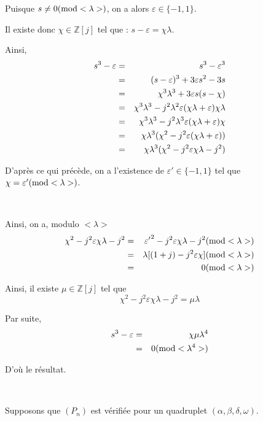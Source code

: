 Puisque $s \neq 0 (\operatorname{mod} < \lambda >)$, on a alors $\varepsilon \in \{ -
1, 1 \}$.

Il existe donc $\chi \in \mathbb{Z} [j]$ tel que : $s - \varepsilon = \chi
\lambda$.

Ainsi,
\begin{eqnarray*}
  s^3 - \varepsilon & = & s^3 - \varepsilon^3\\
  & = & (s - \varepsilon)^3 + 3 \varepsilon s^2 - 3 s\\
  & = & \chi^3 \lambda^3 + 3 \varepsilon s (s - \chi)\\
  & = & \chi^3 \lambda^3 - j^2 \lambda^2 \varepsilon (\chi \lambda +
  \varepsilon) \chi \lambda\\
  & = & \chi^3 \lambda^3 - j^2 \lambda^3 \varepsilon (\chi \lambda +
  \varepsilon) \chi\\
  & = & \chi  \lambda^3 (\chi^2 - j^2 \varepsilon (\chi \lambda +
  \varepsilon))\\
  & = & \chi \lambda^3 (\chi^2 - j^2 \varepsilon  \chi \lambda -
  j^2) 
\end{eqnarray*}


D'apr{\`e}s ce qui pr{\'e}c{\`e}de, on a l'existence de $\varepsilon' \in \{ -
1, 1 \}$ tel que $\chi = \varepsilon'  (\operatorname{mod} < \lambda >)$.

\

Ainsi, on a, modulo $< \lambda >$
\begin{eqnarray*}
  \chi^2 - j^2 \varepsilon \chi \lambda - j^2 & = & {\varepsilon'}^2 - j^2
  \varepsilon \chi \lambda - j^2  (\operatorname{mod} < \lambda >)\\
  & = & \lambda [(1 + j) - j^2 \varepsilon \chi] (\operatorname{mod} < \lambda >)\\
  & = & 0 (\operatorname{mod} < \lambda >)
\end{eqnarray*}


Ainsi, il existe $\mu \in \mathbb{Z} [j]$ tel que
\[ \chi^2 - j^2 \varepsilon \chi \lambda - j^2 = \mu \lambda \]


Par suite,
\begin{eqnarray*}
  s^3 - \varepsilon & = & \chi \mu \lambda^4\\
  & = & 0 (\operatorname{mod} < \lambda^4 >)
\end{eqnarray*}


D'o{\`u} le r{\'e}sultat.

\

 Supposons que $(P_n)$ est v{\'e}rifi{\'e}e pour un quadruplet
$(\alpha, \beta, \delta, \omega)$.

